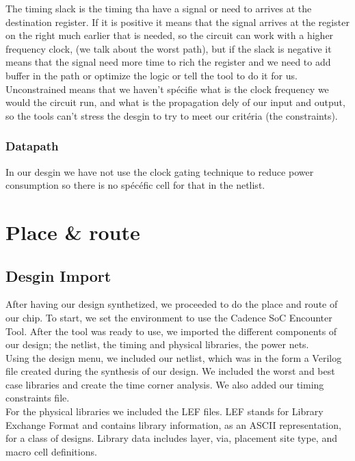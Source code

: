\documentclass[12pt]{article}
\begin{document}
The timing slack is the timing tha have a signal or need to arrives at the destination register. If it is positive it means that the signal arrives at the register on the right much earlier that is needed, so the circuit can work with a higher frequency clock, (we talk about the worst path), but if the slack is negative it means that the signal need more time to rich the register and we need to add buffer in the path or optimize the logic or tell the tool to do it for us.\\
Unconstrained means that we haven't spécifie what is the clock frequency we would the circuit run, and what is the propagation dely of our input and output, so the tools can't stress the desgin to try to meet our critéria (the constraints).

\subsubsection*{Datapath}

In our desgin we have not use the clock gating technique to reduce power consumption so there is no spécéfic cell for that in the netlist.

\section{Place \& route}
\subsection{Desgin Import}
After having our design synthetized, we proceeded to do the place and route of our chip. To start, we set the environment to use the Cadence SoC Encounter Tool. After the tool was ready to use, we imported the different components of our design; the netlist, the timing and physical libraries, the power nets.\\

Using the design menu, we included our netlist, which was in the form a Verilog file created during the synthesis of our design. We included the worst and best case libraries and create the time corner analysis. We also added our timing constraints file.\\

For the physical libraries we included the LEF files. LEF stands for Library Exchange Format and contains library information, as an ASCII representation, for a class of designs. Library data includes layer, via, placement site type, and macro cell definitions.\\
\end{document}
